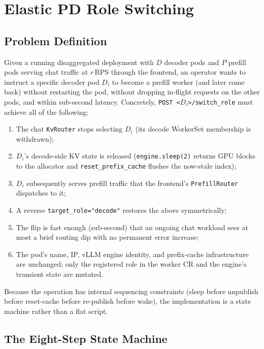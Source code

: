 \documentclass[10pt,twocolumn,letterpaper]{article}
\begin{document}
\section{Elastic PD Role Switching}
\label{sec:role-switch}

\subsection{Problem Definition}
\label{sec:switch-problem}

Given a running disaggregated deployment with $D$ decoder pods and $P$ prefill pods serving chat traffic at $r$\,RPS through the frontend, an operator wants to instruct a specific decoder pod $D_i$ to become a prefill worker (and later come back) without restarting the pod, without dropping in-flight requests on the other pods, and within sub-second latency. Concretely, \texttt{POST~<$D_i$>/switch\_role} must achieve all of the following:

\begin{enumerate}[nosep]
\item The chat \texttt{KvRouter} stops selecting $D_i$ (its decode WorkerSet membership is withdrawn);
\item $D_i$'s decode-side KV state is released (\texttt{engine.sleep(2)} returns GPU blocks to the allocator and \texttt{reset\_prefix\_cache} flushes the now-stale index);
\item $D_i$ subsequently serves prefill traffic that the frontend's \texttt{PrefillRouter} dispatches to it;
\item A reverse \texttt{target\_role="decode"} restores the above symmetrically;
\item The flip is fast enough (sub-second) that an ongoing chat workload sees at most a brief routing dip with no permanent error increase;
\item The pod's name, IP, vLLM engine identity, and prefix-cache infrastructure are unchanged; only the registered role in the worker CR and the engine's transient state are mutated.
\end{enumerate}

Because the operation has internal sequencing constraints (sleep before unpublish before reset-cache before re-publish before wake), the implementation is a state machine rather than a flat script.

\subsection{The Eight-Step State Machine}
\label{sec:state-machine}
\end{document}
